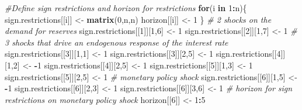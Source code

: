 \documentclass[
  12pt,
]{book}
\newenvironment{Shaded}{\begin{snugshade}}{\end{snugshade}}
\newcommand{\CommentTok}[1]{\textcolor[rgb]{0.56,0.35,0.01}{\textit{#1}}}
\newcommand{\ControlFlowTok}[1]{\textcolor[rgb]{0.13,0.29,0.53}{\textbf{#1}}}
\newcommand{\DecValTok}[1]{\textcolor[rgb]{0.00,0.00,0.81}{#1}}
\newcommand{\FunctionTok}[1]{\textcolor[rgb]{0.13,0.29,0.53}{\textbf{#1}}}
\newcommand{\NormalTok}[1]{#1}
\newcommand{\OtherTok}[1]{\textcolor[rgb]{0.56,0.35,0.01}{#1}}
\newcommand{\SpecialCharTok}[1]{\textcolor[rgb]{0.81,0.36,0.00}{\textbf{#1}}}
\theoremstyle{definition}
\theoremstyle{definition}
\theoremstyle{definition}
\theoremstyle{definition}
\theoremstyle{remark}
\begin{document}
\begin{Shaded}
\begin{Highlighting}[]
\CommentTok{\#Define sign restrictions and horizon for restrictions}
\ControlFlowTok{for}\NormalTok{(i }\ControlFlowTok{in} \DecValTok{1}\SpecialCharTok{:}\NormalTok{n)\{}
\NormalTok{  sign.restrictions[[i]] }\OtherTok{\textless{}{-}} \FunctionTok{matrix}\NormalTok{(}\DecValTok{0}\NormalTok{,n,n)}
\NormalTok{  horizon[[i]] }\OtherTok{\textless{}{-}} \DecValTok{1}
\NormalTok{\}}
\CommentTok{\# 2 shocks on the demand for reserves}
\NormalTok{sign.restrictions[[}\DecValTok{1}\NormalTok{]][}\DecValTok{1}\NormalTok{,}\DecValTok{6}\NormalTok{] }\OtherTok{\textless{}{-}} \DecValTok{1} 
\NormalTok{sign.restrictions[[}\DecValTok{2}\NormalTok{]][}\DecValTok{1}\NormalTok{,}\DecValTok{7}\NormalTok{] }\OtherTok{\textless{}{-}} \DecValTok{1}
\CommentTok{\# 3 shocks that drive an endogenous response of the interest rate}
\NormalTok{sign.restrictions[[}\DecValTok{3}\NormalTok{]][}\DecValTok{1}\NormalTok{,}\DecValTok{1}\NormalTok{] }\OtherTok{\textless{}{-}} \DecValTok{1}
\NormalTok{sign.restrictions[[}\DecValTok{3}\NormalTok{]][}\DecValTok{2}\NormalTok{,}\DecValTok{5}\NormalTok{] }\OtherTok{\textless{}{-}} \DecValTok{1}
\NormalTok{sign.restrictions[[}\DecValTok{4}\NormalTok{]][}\DecValTok{1}\NormalTok{,}\DecValTok{2}\NormalTok{] }\OtherTok{\textless{}{-}} \SpecialCharTok{{-}}\DecValTok{1}
\NormalTok{sign.restrictions[[}\DecValTok{4}\NormalTok{]][}\DecValTok{2}\NormalTok{,}\DecValTok{5}\NormalTok{] }\OtherTok{\textless{}{-}} \DecValTok{1}
\NormalTok{sign.restrictions[[}\DecValTok{5}\NormalTok{]][}\DecValTok{1}\NormalTok{,}\DecValTok{3}\NormalTok{] }\OtherTok{\textless{}{-}} \DecValTok{1}
\NormalTok{sign.restrictions[[}\DecValTok{5}\NormalTok{]][}\DecValTok{2}\NormalTok{,}\DecValTok{5}\NormalTok{] }\OtherTok{\textless{}{-}} \DecValTok{1}
\CommentTok{\# monetary policy shock}
\NormalTok{sign.restrictions[[}\DecValTok{6}\NormalTok{]][}\DecValTok{1}\NormalTok{,}\DecValTok{5}\NormalTok{] }\OtherTok{\textless{}{-}} \SpecialCharTok{{-}}\DecValTok{1}
\NormalTok{sign.restrictions[[}\DecValTok{6}\NormalTok{]][}\DecValTok{2}\NormalTok{,}\DecValTok{3}\NormalTok{] }\OtherTok{\textless{}{-}} \DecValTok{1}
\NormalTok{sign.restrictions[[}\DecValTok{6}\NormalTok{]][}\DecValTok{3}\NormalTok{,}\DecValTok{6}\NormalTok{] }\OtherTok{\textless{}{-}} \DecValTok{1}
\CommentTok{\# horizon for sign restrictions on monetary policy shock}
\NormalTok{horizon[[}\DecValTok{6}\NormalTok{]] }\OtherTok{\textless{}{-}} \DecValTok{1}\SpecialCharTok{:}\DecValTok{5}


\end{Highlighting}
\end{Shaded}
\end{document}
